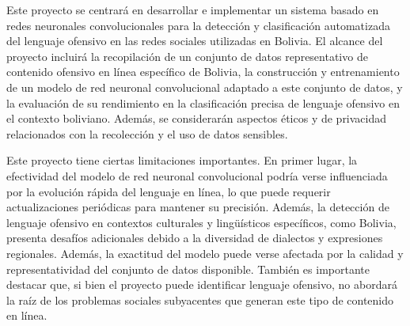 Este proyecto se centrará en desarrollar e implementar un sistema basado en redes neuronales convolucionales para la detección y clasificación automatizada del lenguaje ofensivo en las redes sociales utilizadas en Bolivia. El alcance del proyecto incluirá la recopilación de un conjunto de datos representativo de contenido ofensivo en línea específico de Bolivia, la construcción y entrenamiento de un modelo de red neuronal convolucional adaptado a este conjunto de datos, y la evaluación de su rendimiento en la clasificación precisa de lenguaje ofensivo en el contexto boliviano. Además, se considerarán aspectos éticos y de privacidad relacionados con la recolección y el uso de datos sensibles.

Este proyecto tiene ciertas limitaciones importantes. En primer lugar, la efectividad del modelo de red neuronal convolucional podría verse influenciada por la evolución rápida del lenguaje en línea, lo que puede requerir actualizaciones periódicas para mantener su precisión. Además, la detección de lenguaje ofensivo en contextos culturales y lingüísticos específicos, como Bolivia, presenta desafíos adicionales debido a la diversidad de dialectos y expresiones regionales. Además, la exactitud del modelo puede verse afectada por la calidad y representatividad del conjunto de datos disponible. También es importante destacar que, si bien el proyecto puede identificar lenguaje ofensivo, no abordará la raíz de los problemas sociales subyacentes que generan este tipo de contenido en línea.
